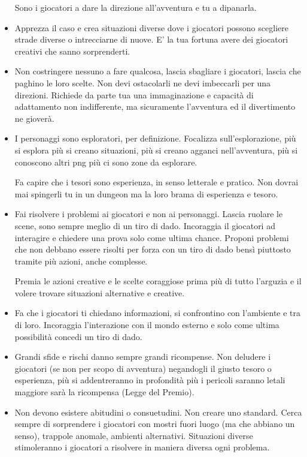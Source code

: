 \begin{multicols}{2}
\begin{itemize}[leftmargin=*]
Sono i giocatori a dare la direzione all'avventura e tu a dipanarla.

\item
Apprezza il caso e crea situazioni diverse dove i giocatori possono scegliere strade diverse o intrecciarne di nuove. E' la tua fortuna avere dei giocatori creativi che sanno sorprenderti.

\item
Non costringere nessuno a fare qualcosa, lascia sbagliare i giocatori, lascia che paghino le loro scelte. Non devi ostacolarli ne devi imbeccarli per una direzioni. Richiede da parte tua una immaginazione e capacità di adattamento non indifferente, ma sicuramente l'avventura ed il divertimento ne gioverà.

\item
I personaggi sono esploratori, per definizione. Focalizza sull'esplorazione, più si esplora più si creano situazioni, più si creano agganci nell'avventura, più si conoscono altri png più ci sono zone da esplorare.

Fa capire che i tesori sono esperienza, in senso letterale e pratico. Non dovrai mai spingerli tu in un dungeon ma la loro brama di esperienza e tesoro.

\item
Fai risolvere i problemi ai giocatori e non ai personaggi. Lascia ruolare le scene, sono sempre meglio di un tiro di dado. Incoraggia il giocatori ad interagire e chiedere una prova solo come ultima chance. Proponi problemi che non debbano essere risolti per forza con un tiro di dado bensì piuttosto tramite più azioni, anche complesse.

Premia le azioni creative e le scelte coraggiose prima più di tutto l'arguzia e il volere trovare situazioni alternative e creative.

\item
Fa che i giocatori ti chiedano informazioni, si confrontino con l'ambiente e tra di loro. Incoraggia l'interazione con il mondo esterno e solo come ultima possibilità concedi un tiro di dado.

\item
Grandi sfide e rischi danno sempre grandi ricompense. Non deludere i giocatori (se non per scopo di avventura) negandogli il giusto tesoro o esperienza, più si addentreranno in profondità più i pericoli saranno letali maggiore sarà la ricompensa (Legge del Premio).

\item
Non devono esistere abitudini o consuetudini. Non creare uno standard.
Cerca sempre di sorprendere i giocatori con mostri fuori luogo (ma che abbiano un senso), trappole anomale, ambienti alternativi. Situazioni diverse stimoleranno i giocatori a risolvere in maniera diversa ogni problema.


\end{itemize}
\end{multicols}
